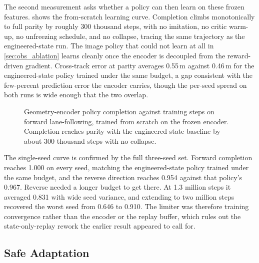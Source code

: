 The second measurement asks whether a policy can then learn on these frozen features.  shows the from-scratch learning curve. Completion climbs monotonically to full parity by roughly 300 thousand steps, with no imitation, no critic warm-up, no unfreezing schedule, and no collapse, tracing the same trajectory as the engineered-state run. The image policy that could not learn at all in \cref{sec:obs_ablation} learns cleanly once the encoder is decoupled from the reward-driven gradient. Cross-track error at parity averages 0.55\,m against 0.46\,m for the engineered-state policy trained under the same budget, a gap consistent with the few-percent prediction error the encoder carries, though the per-seed spread on both runs is wide enough that the two overlap.

\begin{figure}[H]
    \centering
    \caption{Geometry-encoder policy completion against training steps on forward lane-following, trained from scratch on the frozen encoder. Completion reaches parity with the engineered-state baseline by about 300 thousand steps with no collapse.}
    \label{fig:geometry_rl_curve}
\end{figure}

The single-seed curve is confirmed by the full three-seed set. Forward completion reaches 1.000 on every seed, matching the engineered-state policy trained under the same budget, and the reverse direction reaches 0.954 against that policy's 0.967. Reverse needed a longer budget to get there. At 1.3 million steps it averaged 0.831 with wide seed variance, and extending to two million steps recovered the worst seed from 0.646 to 0.910. The limiter was therefore training convergence rather than the encoder or the replay buffer, which rules out the state-only-replay rework the earlier result appeared to call for.

\subsection{Safe Adaptation}

